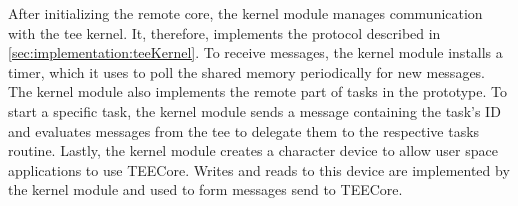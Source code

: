 After initializing the remote core, the kernel module manages communication with
the \gls{tee} kernel. It, therefore, implements the protocol described in
\ref{sec:implementation:teeKernel}. To receive messages, the kernel module
installs a timer, which it uses to poll the shared memory periodically for new
messages. The kernel module also implements the remote part of tasks in the
prototype. To start a specific task, the kernel module sends a message
containing the task's ID and evaluates messages from the \gls{tee} to delegate
them to the respective tasks routine. Lastly, the kernel module creates a
character device to allow user space applications to use TEECore. Writes and
reads to this device are implemented by the kernel module and used to form
messages send to TEECore.

